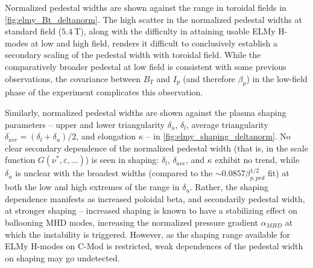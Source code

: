 Normalized pedestal widths are shown against the range in toroidal fields in \cref{fig:elmy_Bt_deltanorm}.  The high scatter in the normalized pedestal widths at standard field ($\SI{5.4}{\tesla}$), along with the difficulty in attaining usable ELMy H-modes at low and high field, renders it difficult to conclusively establish a secondary scaling of the pedestal width with toroidal field.  While the comparatively broader pedestal at low field is consistent with some previous observations, the covariance between $B_T$ and $I_p$ (and therefore $\beta_p$) in the low-field phase of the experiment complicates this observation.

\begin{figure}
 \pushtooutside
\end{figure}

Similarly, normalized pedestal widths are shown against the plasma shaping parameters -- upper and lower triangularity $\delta_u$, $\delta_l$, average triangularity $\delta_{ave} = (\delta_l + \delta_u)/2$, and elongation $\kappa$ -- in \cref{fig:elmy_shaping_deltanorm}.  No clear secondary dependence of the normalized pedestal width (that is, in the scale function $G(\nu^*,\varepsilon,...)$) is seen in shaping: $\delta_l$, $\delta_{ave}$, and $\kappa$ exhibit no trend, while $\delta_u$ is unclear with the broadest widths (compared to the $\sim 0.0857 \beta_{p,ped}^{1/2}$ fit) at both the low and high extremes of the range in $\delta_u$.  Rather, the shaping dependence manifests as increased poloidal beta, and secondarily pedestal width, at stronger shaping -- increased shaping is known to have a stabilizing effect on ballooning MHD modes, increasing the normalized pressure gradient $\alpha_{MHD}$ at which the instability is triggered.  However, as the shaping range available for ELMy H-modes on C-Mod is restricted, weak dependences of the pedestal width on shaping may go undetected.

